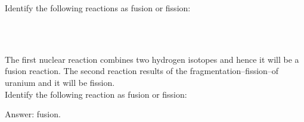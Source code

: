 \documentclass[main.tex]{subfiles}
\begin{document}
\begin{description}
\begin{example} %
Identify the following reactions as fusion or fission:
\begin{center}\\
\end{center}
\\
The first nuclear reaction combines two hydrogen isotopes and hence it will be a fusion reaction. The second reaction results of the fragmentation--fission--of uranium and it will be fission.
\faDiamond\ \\
Identify the following reaction as fusion or fission:
\begin{center}\end{center} 
\flushright Answer: fusion.
\end{example}%
\end{description}




\clearpage\thispagestyle{empty}\mbox{}\clearpage
\end{document}
